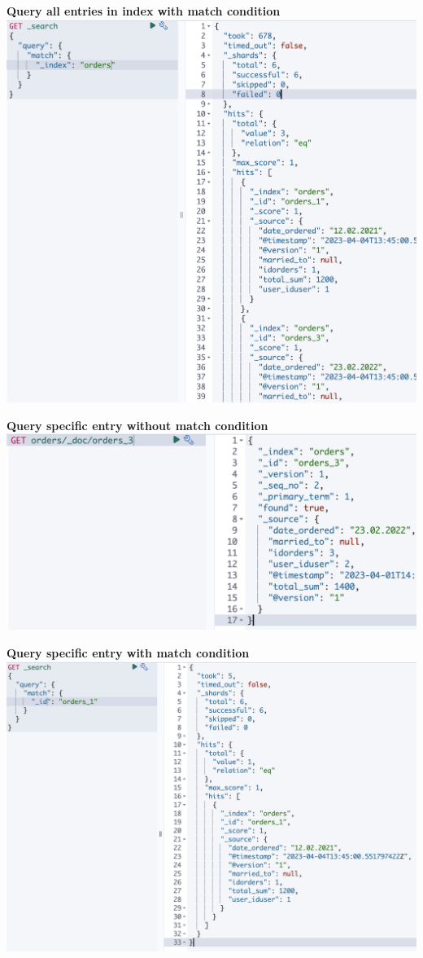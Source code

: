 \documentclass[14pt,a4paper]{extarticle}
\begin{document}
	\noindent \textbf{Query all entries in index with match condition} \\
	\includegraphics[height=0.47\textheight]{images/search_all_match.png}

	\newpage

	\noindent \textbf{Query specific entry without match condition} \\
	\includegraphics[width=\textwidth]{images/search_one.png}

	\noindent \textbf{Query specific entry with match condition} \\
	\includegraphics[width=\textwidth]{images/search_one_match.png}
\end{document}
